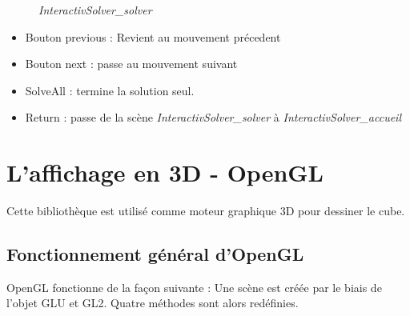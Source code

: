 \begin{figure}[h]
\begin{center}
\end{center}
	\caption{ \textit{InteractivSolver\_solver}}
\end{figure}

\begin{itemize}
    \item Bouton previous : Revient au mouvement précedent
    \item Bouton next : passe au mouvement suivant 
    \item SolveAll : termine la solution seul.
    \item Return : passe de la scène \textit{InteractivSolver\_solver} à \textit{InteractivSolver\_accueil}
\end{itemize}

\section{L'affichage en 3D - OpenGL}

Cette bibliothèque est utilisé comme moteur graphique 3D pour dessiner le cube.

\subsection{Fonctionnement général d'OpenGL}
OpenGL fonctionne de la façon suivante :
	Une scène est créée par le biais de l’objet GLU et GL2.
	Quatre méthodes sont alors redéfinies.

